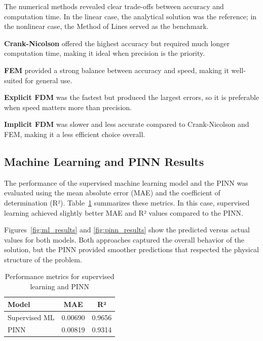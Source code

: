 \documentclass[conference]{IEEEtran}
\begin{document}
\noindent
The numerical methods revealed clear trade-offs between accuracy and computation time. In the linear case, the analytical solution was the reference; in the nonlinear case, the Method of Lines served as the benchmark.

\medskip

\noindent
\textbf{Crank-Nicolson} offered the highest accuracy but required much longer computation time, making it ideal when precision is the priority.

\noindent
\textbf{FEM} provided a strong balance between accuracy and speed, making it well-suited for general use.

\noindent
\textbf{Explicit FDM} was the fastest but produced the largest errors, so it is preferable when speed matters more than precision.

\noindent
\textbf{Implicit FDM} was slower and less accurate compared to Crank-Nicolson and FEM, making it a less efficient choice overall.

\medskip





\subsection{Machine Learning and PINN Results}

The performance of the supervised machine learning model and the PINN was evaluated using the mean absolute error (MAE) and the coefficient of determination (R²). Table~\ref{tab:ml_metrics} summarizes these metrics. In this case, supervised learning achieved slightly better MAE and R² values compared to the PINN.

Figures~\ref{fig:ml_results} and \ref{fig:pinn_results} show the predicted versus actual values for both models. Both approaches captured the overall behavior of the solution, but the PINN provided smoother predictions that respected the physical structure of the problem.

\begin{table}[!ht]
\centering
\caption{Performance metrics for supervised learning and PINN}
\label{tab:ml_metrics}
\begin{tabular}{lcc}
\hline
\textbf{Model} & \textbf{MAE} & \textbf{R²} \\
\hline
Supervised ML & 0.00690 & 0.9656 \\
PINN & 0.00819 & 0.9314 \\
\hline
\end{tabular}
\end{table}
\end{document}
